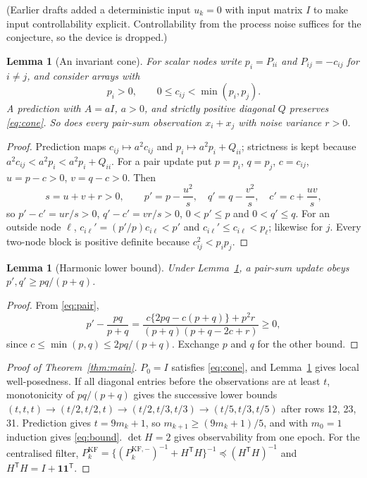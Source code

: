 \documentclass[11pt,a4paper]{article}
\numberwithin{equation}{section}
\newtheorem{lemma}[theorem]{Lemma}
\theoremstyle{remark}\newtheorem{remark}[theorem]{Remark}
\newcommand{\T}{^{\mathsf T}}
\newcommand{\one}{\mathbf 1}
\begin{document}
(Earlier drafts added a deterministic input $u_k=0$ with input matrix $I$ to make input
controllability explicit. Controllability from the process noise suffices for the conjecture,
so the device is dropped.)

\begin{lemma}[An invariant cone]\label{lem:cone}
For scalar nodes write $p_i=P_{ii}$ and $P_{ij}=-c_{ij}$ for $i\ne j$, and consider arrays with
\begin{equation}\label{eq:cone}
p_i>0,\qquad 0\le c_{ij}<\min(p_i,p_j).
\end{equation}
A prediction with $A=aI$, $a>0$, and strictly positive diagonal $Q$ preserves
\eqref{eq:cone}. So does every pair-sum observation $x_i+x_j$ with noise variance $r>0$.
\end{lemma}

\begin{proof}
Prediction maps $c_{ij}\mapsto a^2c_{ij}$ and $p_i\mapsto a^2p_i+Q_{ii}$; strictness is kept
because $a^2c_{ij}<a^2p_i<a^2p_i+Q_{ii}$. For a pair update put $p=p_i$, $q=p_j$, $c=c_{ij}$,
$u=p-c>0$, $v=q-c>0$. Then
\begin{equation}\label{eq:pair}
s=u+v+r>0,\qquad p'=p-\frac{u^2}{s},\quad q'=q-\frac{v^2}{s},\quad c'=c+\frac{uv}{s},
\end{equation}
so $p'-c'=ur/s>0$, $q'-c'=vr/s>0$, $0<p'\le p$ and $0<q'\le q$. For an outside node $\ell$,
$c_{i\ell}'=(p'/p)c_{i\ell}<p'$ and $c_{i\ell}'\le c_{i\ell}<p_\ell$; likewise for $j$. Every
two-node block is positive definite because $c_{ij}^2<p_ip_j$.
\end{proof}

\begin{lemma}[Harmonic lower bound]\label{lem:harm}
Under Lemma~\ref{lem:cone}, a pair-sum update obeys $p',q'\ge pq/(p+q)$.
\end{lemma}

\begin{proof}
From \eqref{eq:pair},
\begin{equation}\label{eq:harm}
p'-\frac{pq}{p+q}=\frac{c\{2pq-c(p+q)\}+p^2r}{(p+q)(p+q-2c+r)}\ge0,
\end{equation}
since $c\le\min(p,q)\le2pq/(p+q)$. Exchange $p$ and $q$ for the other bound.
\end{proof}

\begin{proof}[Proof of Theorem~\ref{thm:main}]
$P_0=I$ satisfies \eqref{eq:cone}, and Lemma~\ref{lem:cone} gives local well-posedness. If all
diagonal entries before the observations are at least $t$, monotonicity of $pq/(p+q)$ gives the
successive lower bounds $(t,t,t)\to(t/2,t/2,t)\to(t/2,t/3,t/3)\to(t/5,t/3,t/5)$ after rows
12, 23, 31. Prediction gives $t=9m_k+1$, so $m_{k+1}\ge(9m_k+1)/5$, and with $m_0=1$ induction
gives \eqref{eq:bound}. $\det H=2$ gives observability from one epoch. For the centralised
filter, $P_k^{\mathrm{KF}}=\{(P_k^{\mathrm{KF},-})^{-1}+H\T H\}^{-1}\preceq(H\T H)^{-1}$ and
$H\T H=I+\one\one\T$.
\end{proof}
\end{document}
